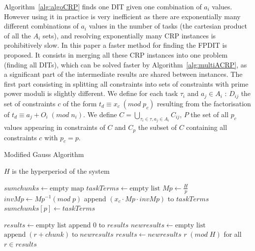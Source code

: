 \documentclass[conference]{IEEEtran}
\begin{document}
		Algorithm~\ref{alg:algoCRP} finds one DIT given one combination of $a_i$
		values. However using it in practice is very inefficient as there are
		exponentially many different combinations of $a_i$ values in the number of
		tasks (the cartesian product of all the $A_i$ sets), and resolving
		exponentially many CRP instances is prohibitively slow.
		In this paper a faster method for finding the FPDIT is proposed. It consists
		in merging all these CRP instances into one problem (finding all DITs), which can be solved faster by
		Algorithm~\ref{alg:multiACRP}, as a significant part of the intermediate
		results are shared between instances. The first part consisting in splitting
		all constraints into sets of constraints with prime power moduli is slightly
		different. We define for each task $\tau_i$ and $a_j \in A_i$ :
		$D_{ij}$ the set of constraints $c$ of the form $t_d \equiv x_c
		\; (mod \; p_c)$ resulting from the factorisation of $t_d
		\equiv a_j+O_i \; (mod \; n_i)$. We define $C = \bigcup\limits_{\tau_i \in \tau,
		a_j \in A_i}{C_{ij}}$, $P$ the set of all $p_c$ values appearing in
		constraints of $C$ and $C_{p}$ the subset of $C$ containing all constraints
		$c$ with $p_c = p$.

		\begin{algorithm}
			\caption{Modified Gauss Algorithm}
			\label{alg:multiACRP}
			\begin{algorithmic}[1]
				\REQUIRE $H$ is the hyperperiod of the system

				\STATE $sumchunks \leftarrow \text{empty map}$
					\STATE $taskTerms \leftarrow \text{empty list}$
					\STATE $Mp \leftarrow \frac{H}{p}$
					\STATE $invMp \leftarrow Mp^{-1} (mod \; p)$
						\STATE append $(x_c \cdot Mp \cdot invMp)$ to $taskTerms$
					\ENDFOR
					\STATE $sumchunks[p] \leftarrow taskTerms$
				\ENDFOR

				\STATE $results \leftarrow \text{empty list}$
				\STATE append $0$ to $results$
					\STATE $newresults \leftarrow \text{empty list}$
							\STATE $\text{append} \; (r + chunk) \; \text{to} \; newresults$
						\ENDFOR
					\ENDFOR
					\STATE $results \leftarrow newresults$
				\ENDFOR
				\RETURN $r \; (mod \; H)$ for all $r \in results$
			\end{algorithmic}
		\end{algorithm}
		
\end{document}
